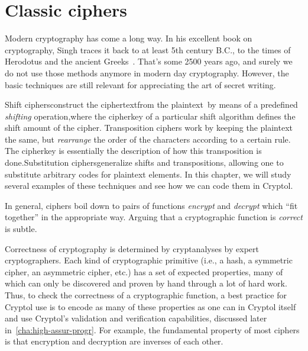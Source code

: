 
\chapter{Classic ciphers}
\label{chapter:classic}

Modern cryptography has come a long way. In his excellent book on
cryptography, Singh traces it back to at least 5th century B.C., to
the times of Herodotus and the ancient Greeks~\cite{Singh:1999:CBE}.
That's some 2500 years ago, and surely we do not use those methods
anymore in modern day cryptography. However, the basic techniques are
still relevant for appreciating the art of secret writing.

Shift ciphers\indShiftcipher construct the \glosCiphertext
ciphertext\indCiphertext from the \glosPlaintext
plaintext\indPlaintext\ by means of a predefined {\em shifting}
operation,\glosCipherkey where the cipherkey of a particular shift
algorithm defines the shift amount of the cipher.\indCipherkey
Transposition ciphers work by keeping the plaintext the same, but {\em
  rearrange} the order of the characters according to a certain rule.
The cipherkey is essentially the description of how this transposition
is done.\indTranspositioncipher Substitution
ciphers\indSubstitutioncipher generalize shifts and transpositions,
allowing one to substitute arbitrary codes for plaintext elements.  In
this chapter, we will study several examples of these techniques and
see how we can code them in Cryptol.

In general, ciphers boil down to pairs of functions \emph{encrypt} and
\emph{decrypt} which ``fit together'' in the appropriate way.  Arguing
that a cryptographic function is \emph{correct} is subtle.

Correctness of cryptography is determined by cryptanalyses by expert
cryptographers.  Each kind of cryptographic primitive (i.e., a hash, a
symmetric cipher, an asymmetric cipher, etc.) has a set of expected
properties, many of which can only be discovered and proven by hand
through a lot of hard work.  Thus, to check the correctness of a
cryptographic function, a best practice for Cryptol use is to encode
as many of these properties as one can in Cryptol itself and use
Cryptol's validation and verification capabilities, discussed
later in~\autoref{cha:high-assur-progr}.  For example, the fundamental
property of most ciphers is that encryption and decryption are
inverses of each other.

